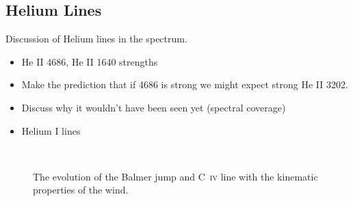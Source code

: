 \documentclass[preprint, a4paper, 11pt]{aastex}
\begin{document}
\subsection{Helium Lines}
Discussion of Helium lines in the spectrum.
\begin{itemize}
\item He II 4686, He II 1640 strengths
\item Make the prediction that if 4686 is strong we might expect strong He II 3202. 
\item Discuss why it wouldn't have been seen yet (spectral coverage)
\item Helium I lines
\end{itemize}

\begin{figure} %
\mbox{
\quad
{}   
}
\caption{The evolution of the Balmer jump and C~\textsc{iv} line with the kinematic properties
of the wind. 
}
\label{jump}
\end{figure}
\end{document}
